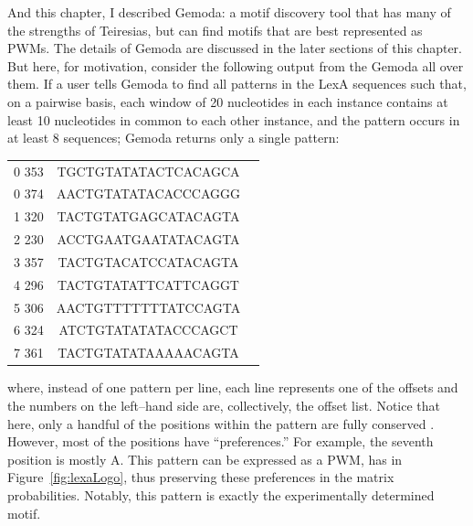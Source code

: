 And this chapter, I described Gemoda: a motif discovery tool that
has many of the strengths of Teiresias, but can find motifs that are
best represented as PWMs.  The details of Gemoda are discussed in
the later sections of this chapter.  But here, for motivation,
consider the following output from the Gemoda all over them.  If a
user tells Gemoda to find all patterns in the LexA sequences such
that, on a pairwise basis, each window of 20 nucleotides in each
instance contains at least 10 nucleotides in common to each other
instance, and the pattern occurs in at least 8 sequences; Gemoda
returns
only a single pattern: \\
    {
    \begin{center}
    \ttfamily
    \begin{singlespace}
    \begin{tabular}{ccl}
       0  353 &TGCTGTATATACTCACAGCA \\
       0  374 &AACTGTATATACACCCAGGG \\
       1  320 &TACTGTATGAGCATACAGTA \\
       2  230 &ACCTGAATGAATATACAGTA \\
       3  357 &TACTGTACATCCATACAGTA \\
       4  296 &TACTGTATATTCATTCAGGT \\
       5  306 &AACTGTTTTTTTATCCAGTA \\
       6  324 &ATCTGTATATATACCCAGCT \\
       7  361 &TACTGTATATAAAAACAGTA \\
    \end{tabular}
    \end{singlespace}
    \end{center}
    }
where, instead of one pattern per line, each line represents one of
the offsets and the numbers on the left--hand side are,
collectively, the offset list. Notice that here, only a handful of
the positions within the pattern are fully conserved . However, most
of the positions have ``preferences.'' For example, the seventh
position is mostly A\@. This pattern can be expressed as a PWM, has
in Figure~\vref{fig:lexaLogo}, thus preserving these preferences in
the matrix probabilities. Notably, this pattern is exactly the
experimentally determined motif.

